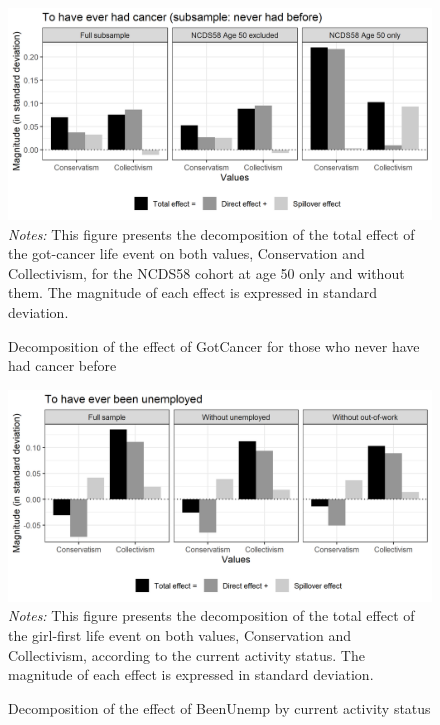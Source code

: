 \begin{figure}[!htb]
    \centering
    \caption{Decomposition of the effect of GotCancer for those who never have had cancer before}
    \label{chap3-fig:sem-decomp-v5-GCNever}
    \includegraphics[width=\linewidth]{chap3/graphic/decomp-v5-GCNever.png}
    \hrulefill
	\vspace{-3em}
	\justify\singlespacing\footnotesize{\textit{Notes:} This figure presents the decomposition of the total effect of the got-cancer life event on both values, Conservation and Collectivism, for the NCDS58 cohort at age 50 only and without them. The magnitude of each effect is expressed in standard deviation.}
\end{figure}

\begin{figure}[!htb]
    \centering
    \caption{Decomposition of the effect of BeenUnemp by current activity status}
    \label{chap3-fig:sem-decomp-v5-BUActivity}
    \includegraphics[width=\linewidth]{chap3/graphic/decomp-v5-BUActivity.png}
    \hrulefill
	\vspace{-3em}
	\justify\singlespacing\footnotesize{\textit{Notes:} This figure presents the decomposition of the total effect of the girl-first life event on both values, Conservation and Collectivism, according to the current activity status. The magnitude of each effect is expressed in standard deviation.}
\end{figure}